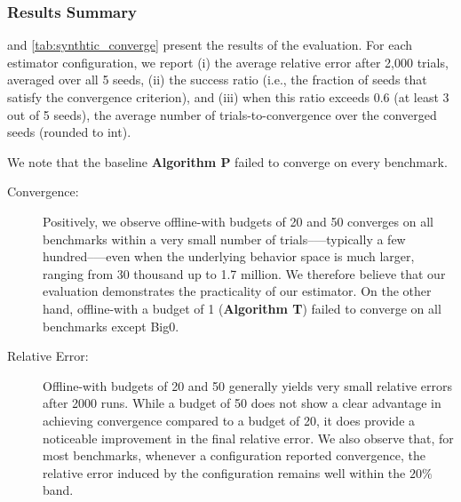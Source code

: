 \subsubsection*{Results Summary}

 and \ref{tab:synthtic_converge} present the results of the evaluation. 
For each estimator configuration, we report (i) the average relative error after 2,000 trials, averaged over all 5 seeds, 
(ii) the success ratio (i.e., the fraction of seeds that satisfy the convergence criterion), and 
(iii) when this ratio exceeds 0.6 (at least 3 out of 5 seeds), the average number of trials-to-convergence over the converged seeds (rounded to int).

We note that the baseline \textbf{Algorithm P} failed to converge on every benchmark.


\begin{description}
    \item[Convergence:] Positively, we observe offline-\testor with budgets of 20 and 50 converges on all benchmarks within a very small 
    number of trials--—typically a few hundred--—even when the underlying behavior space is much larger, 
    ranging from 30 thousand up to 1.7 million. We therefore believe that our evaluation demonstrates the practicality of our estimator.
    On the other hand, offline-\testor with a budget of 1 (\textbf{Algorithm T}) failed to converge on all benchmarks except Big0.
    \item[Relative Error:] Offline-\testor with budgets of 20 and 50 generally yields very small relative errors after 2000 runs. While a budget of 50 does not show a clear advantage in achieving convergence compared to a budget of 20, it does provide a noticeable improvement in the final relative error. We also observe that, for most benchmarks, whenever a configuration reported convergence, the relative error induced by the configuration remains well within the $20\%$ band.
\end{description}

